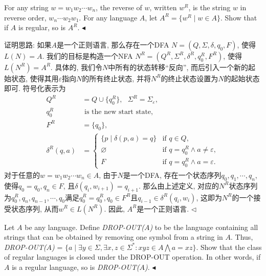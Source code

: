 \documentclass[11pt]{article}
\newenvironment{problem}[2][Problem]{\begin{trivlist}
\item[\hskip \labelsep{\bfseries#1}\hskip\labelsep{\bfseries#2.}]}{\hfill$\blacktriangleleft$\end{trivlist}}
\newenvironment{answer}[1][Answer]{\begin{trivlist}
\item[\hskip \labelsep{\bfseries\itshape#1.}\hskip \labelsep]}{\hfill$\lhd$\end{trivlist}}
\begin{document}
\begin{problem}{2.(20 points)}
    For any string $w = w_1w_2\cdots w_n$, the reverse of $w$, written $w^R$, is the string $w$ in reverse
    order, $w_n\cdots w_2w_1$. For any language $A$, let $A^R = \{w^R\mid w\in A\}$. Show that if $A$ is regular, so is $A^R$.
\end{problem}
\begin{answer}
    证明思路: 如果$A$是一个正则语言, 那么存在一个DFA $N = (Q, \Sigma, \delta, q_0, F)$, 使得$L(N) = A$. 我们的目标是构造一个NFA $N^R = (Q^R, \Sigma^R, \delta^R, q_0^R, F^R)$, 使得$L(N^R) = A^R$. 
    具体的, 我们令$N$中所有的状态转移“反向”, 而后引入一个新的起始状态, 使得其用$\varepsilon$指向$N$的所有终止状态, 并将$N^R$的终止状态设置为$N$的起始状态即可. 符号化表示为
    \begin{align*}
        Q^R &= Q \cup \{q_0^R\},~~~ \Sigma^R = \Sigma_{\varepsilon},\\
        q_0^R  & \text{ is the new start state,} \\
        F^R &= \{q_0\},\\
        \delta^R(q, a) &=\begin{cases}
            \{p\mid \delta(p, a) = q\}  & \text{if } q \in Q,\\
            \varnothing & \text{if } q = q_0^R \land a \neq \varepsilon,\\
            F & \text{if } q = q_0^R \land a = \varepsilon.
        \end{cases} 
    \end{align*}
    对于任意的$w = w_1w_2\cdots w_n \in A$, 由于$N$是一个DFA, 存在一个状态序列$q_0, q_1, \cdots, q_n$, 使得$q_0 = q_0, q_n \in F$, 且$\delta(q_i, w_{i+1}) = q_{i+1}$. 那么由上述定义, 对应的$N^R$状态序列为$q_0^R, q_n, q_{n-1}, \cdots, q_0$满足$q_0^R = q_0^R, q_0 \in F^R$且$q_{i-1} \in \delta^R(q_i, w_i)$, 这即为$N^R$的一个接受状态序列, 从而$w^R \in L(N^R)$. 因此, $A^R$是一个正则语言.
\end{answer}
\begin{problem}{3.(20 points)}
    Let $A$ be any language. Define \textit{DROP-OUT($A$)} to be the language containing all strings
    that can be obtained by removing one symbol from a string in $A$. Thus, \textit{DROP-OUT($A$)} = $\{a\mid\exists y \in \Sigma, \exists x, z\in\Sigma^*: xyz\in A\bigwedge a = xz\}$. 
    Show that the class of regular languages is closed under the
    DROP-OUT operation. In other words, if $A$ is a regular language, so is \textit{DROP-OUT($A$)}.
\end{problem}
\end{document}
